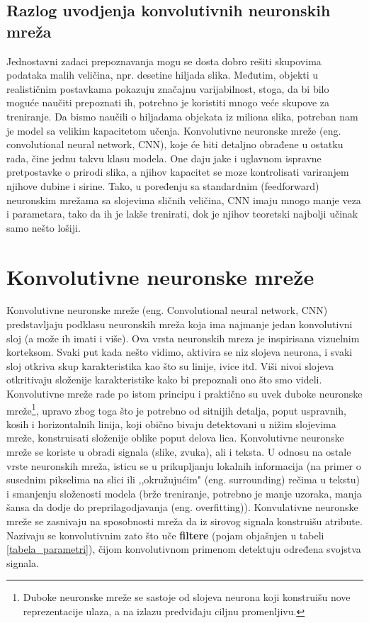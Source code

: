 \documentclass[a4paper]{article}
\begin{document}
\subsection{Razlog uvodjenja konvolutivnih neuronskih mreža}
Jednostavni zadaci prepoznavanja mogu se dosta dobro rešiti skupovima podataka malih veličina, npr. desetine hiljada slika. Međutim, objekti u realističnim postavkama pokazuju značajnu varijabilnost, stoga, da bi bilo moguće naučiti prepoznati ih, potrebno je koristiti mnogo veće skupove za treniranje. Da bismo naučili o hiljadama objekata iz miliona slika, potreban nam je model sa velikim kapacitetom učenja. Konvolutivne neuronske mreže (eng. convolutional neural network, CNN), koje će biti detaljno obrađene u ostatku rada, čine jednu takvu klasu modela. One daju jake i uglavnom ispravne pretpostavke o prirodi slika, a njihov kapacitet se moze kontrolisati variranjem njihove dubine i sirine. Tako, u poređenju sa standardnim (feedforward) neuronskim mrežama sa slojevima sličnih veličina, CNN imaju mnogo manje veza i parametara, tako da ih je lakše trenirati, dok je njihov teoretski najbolji učinak samo nešto lošiji.


\section{Konvolutivne neuronske mreže}	
\label{sec:podnaslov3}


Konvolutivne neuronske mreže (eng. Convolutional neural network, CNN) predstavljaju podklasu neuronskih mreža koja ima najmanje jedan konvolutivni sloj (a može ih imati i više). Ova vrsta neuronskih mreza je inspirisana vizuelnim korteksom. Svaki put kada nešto vidimo, aktivira se niz slojeva neurona, i svaki sloj otkriva skup karakteristika kao što su linije, ivice itd. Viši nivoi slojeva otkritivaju složenije karakteristike kako bi prepoznali ono što smo videli. Konvolutivne mreže rade po istom principu i praktično su uvek duboke neuronske mreže\footnote{Duboke neuronske mreže se sastoje od slojeva neurona koji konstruišu nove reprezentacije ulaza, a na izlazu predviđaju ciljnu promenljivu.}, upravo zbog toga što je potrebno od sitnijih detalja, poput uspravnih, kosih i horizontalnih linija, koji obično bivaju detektovani u nižim slojevima mreže, konstruisati složenije oblike poput delova lica. Konvolutivne neuronske mreže se koriste u obradi signala (slike, zvuka), ali i teksta. U odnosu na ostale vrste neuronskih mreža, isticu se u prikupljanju lokalnih informacija (na primer o susednim pikselima na slici ili ,,okružujućim" (eng. surrounding) rečima u tekstu) i smanjenju složenosti modela (brže treniranje, potrebno je manje uzoraka, manja šansa da dodje do preprilagodjavanja (eng. overfitting)). Konvulativne neuronske mreže se zasnivaju na sposobnosti mreža da iz sirovog signala konstruišu atribute. Nazivaju se konvolutivnim zato što uče \textbf{filtere} (pojam objašnjen u tabeli \ref{tabela_parametri}), čijom konvolutivnom primenom detektuju određena svojstva signala.
\end{document}
